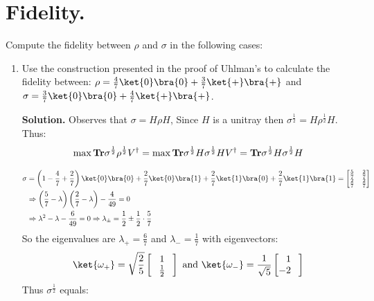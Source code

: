 \documentclass[12pt,a4paper]{article}
\begin{document}
\section{Fidelity.}
Compute the fidelity between $\rho$ and $\sigma$ in the following cases: 
\begin{enumerate}
  \item Use the construction presented in the proof of Uhlman's to calculate the fidelity between: $\rho = \frac{4}{7}\ket{0}\bra{0} + \frac{3}{7}\ket{+}\bra{+}$  and $\sigma = \frac{3}{7}\ket{0}\bra{0} + \frac{4}{7}\ket{+}\bra{+}$. 
    

    \textbf{Solution.} Observes that $\sigma = H\rho H$, Since $H$ is a unitray then $\sigma^{\frac{1}{2}} = H \rho^{\frac{1}{2}} H$. Thus: 
    \begin{equation*}
      \begin{split}
        \max \textbf{Tr} \sigma^{\frac{1}{2}} \rho^{\frac{1}{2}} V^{\dagger} & = \max  \textbf{Tr}  \sigma^{\frac{1}{2}} H \sigma^{\frac{1}{2}} H V^{\dagger} = \textbf{Tr}  \sigma^{\frac{1}{2}} H \sigma^{\frac{1}{2}} H \\ 
      \end{split}
    \end{equation*}


    \begin{equation*}
      \begin{split}
        \sigma & = \left( 1 - \frac{4}{7} + \frac{2}{7}  \right) \ket{0}\bra{0} + \frac{2}{7}\ket{0}\bra{1} +\frac{2}{7}\ket{1}\bra{0} +\frac{2}{7}\ket{1}\bra{1} = \begin{bmatrix}
             \frac{5}{7}  & \frac{2}{7}   \\
             \frac{2}{7} & \frac{2}{7}   
           \end {bmatrix} \\ 
            & \Rightarrow\left( \frac{5}{7} -  \lambda \right)\left(   \frac{2}{7} - \lambda \right) - \frac{4}{49} = 0 \\ 
           & \Rightarrow  \lambda^2 - \lambda  - \frac{6}{49} = 0 \Rightarrow  \lambda_{\pm} =  \frac{1}{2} \pm \frac{1}{2} \cdot \frac{5}{7}  \\ 
      \end{split}
    \end{equation*}
    So the eigenvalues are $ \lambda_{+} =  \frac{6}{7}$ and $\lambda_{-} = \frac{1}{7}$ with eigenvectors: 
    \begin{equation*}
      \begin{split}
        &  \ket{\omega_{+}} = \sqrt{\frac{2}{5}} \begin{bmatrix} 1 \\ \phantom{-} \frac{1}{2} \phantom{-}\end{bmatrix} \text{ and }  \ket{\omega_{-}} =\frac{1}{\sqrt{5}} \begin{bmatrix} 1 \\ -2 \phantom{-}\end{bmatrix} \\   
      \end{split}
    \end{equation*}
    Thus $\sigma^{\frac{1}{2}}$ equals: 



\end{enumerate}
\end{document}
